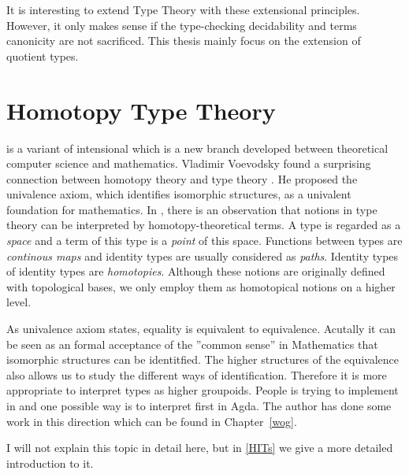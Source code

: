 It is interesting to extend Type Theory with these extensional principles. However, it only makes sense if the type-checking decidability and terms canonicity are not sacrificed. This thesis mainly focus on the extension of quotient types.


\section{Homotopy Type Theory}

\hott is a variant of intensional \mltt{} which is a new branch developed between theoretical computer science
and mathematics. Vladimir Voevodsky found a surprising connection between homotopy theory and type theory \cite{voe:06}. He proposed the univalence axiom, which identifies isomorphic structures, as a univalent foundation for mathematics. 
In \hott, there is an observation that notions in type theory can be interpreted by homotopy-theoretical terms. A type is regarded as a \emph{space} and a term of this type is a \emph{point} of this space. Functions between types are \emph{continous maps} and identity types are usually considered as \emph{paths}. Identity types of identity types are \emph{homotopies}. Although these notions are originally defined with topological bases, we only employ them as homotopical notions on a higher level. 


As univalence axiom states, equality is equivalent to equivalence. Acutally it can be seen as an formal acceptance of the ''common sense'' in Mathematics that isomorphic structures can be identitfied. The higher structures of the equivalence also allows us to study the different ways of identification. Therefore it is more appropriate to interpret types as higher groupoids. People is trying to implement \hott in \itt and one possible way is to interpret \wog first in Agda. The author has done some work in this direction which can be found in Chapter~\ref{wog}.


I will not explain this topic in detail here, but in \autoref{HITs}
we give a more detailed introduction to it.




